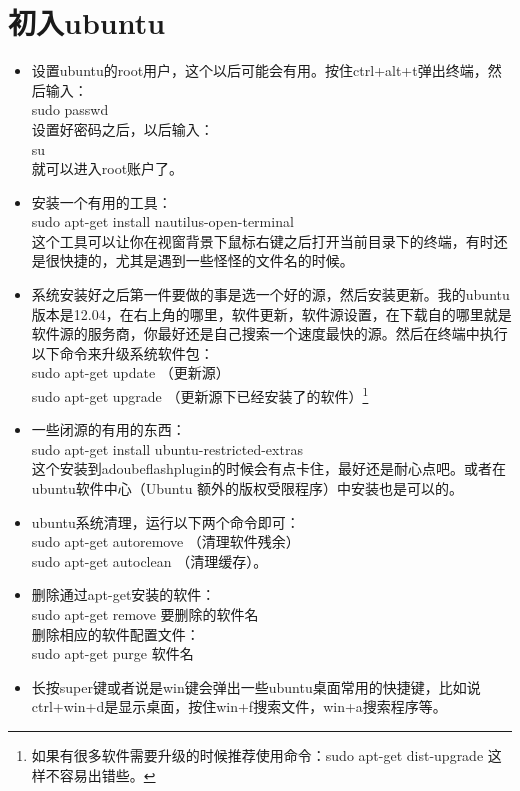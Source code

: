 \section{初入ubuntu}
\begin{itemize}
\item 设置ubuntu的root用户，这个以后可能会有用。按住ctrl+alt+t弹出终端，然后输入：\\ sudo passwd \\设置好密码之后，以后输入：\\ su\\就可以进入root账户了。
\item 安装一个有用的工具：\\sudo apt-get install nautilus-open-terminal\\这个工具可以让你在视窗背景下鼠标右键之后打开当前目录下的终端，有时还是很快捷的，尤其是遇到一些怪怪的文件名的时候。
\item 系统安装好之后第一件要做的事是选一个好的源，然后安装更新。我的ubuntu版本是12.04，在右上角的哪里，软件更新，软件源设置，在下载自的哪里就是软件源的服务商，你最好还是自己搜索一个速度最快的源。然后在终端中执行以下命令来升级系统软件包：\\sudo apt-get update  （更新源）\\sudo apt-get upgrade   （更新源下已经安装了的软件）\footnote{如果有很多软件需要升级的时候推荐使用命令：sudo apt-get dist-upgrade 这样不容易出错些。}
\item 一些闭源的有用的东西：\\sudo apt-get install ubuntu-restricted-extras\\这个安装到adoubeflashplugin的时候会有点卡住，最好还是耐心点吧。或者在ubuntu软件中心（Ubuntu 额外的版权受限程序）中安装也是可以的。
\item ubuntu系统清理，运行以下两个命令即可：\\sudo apt-get autoremove （清理软件残余）\\sudo apt-get autoclean  （清理缓存）。
\item 删除通过apt-get安装的软件：\\sudo apt-get remove 要删除的软件名\\删除相应的软件配置文件：\\sudo apt-get purge 软件名
\item 长按super键或者说是win键会弹出一些ubuntu桌面常用的快捷键，比如说ctrl+win+d是显示桌面，按住win+f搜索文件，win+a搜索程序等。
\end{itemize}

